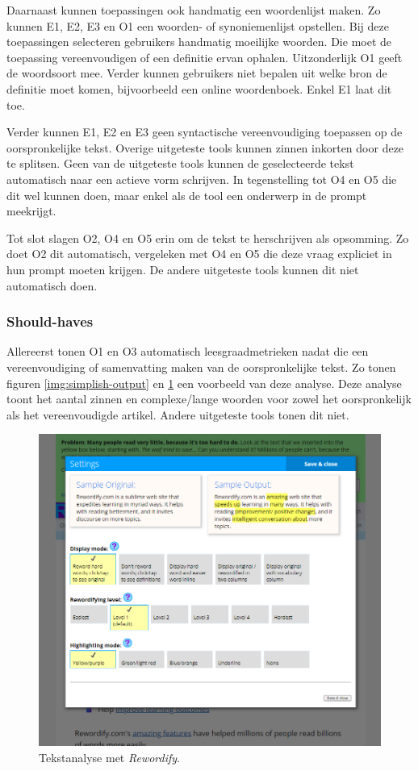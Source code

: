 Daarnaast kunnen toepassingen ook handmatig een woordenlijst maken. Zo kunnen E1, E2, E3 en O1 een woorden- of synoniemenlijst opstellen. Bij deze toepassingen selecteren gebruikers handmatig moeilijke woorden. Die moet de toepassing vereenvoudigen of een definitie ervan ophalen. Uitzonderlijk O1 geeft de woordsoort mee. Verder kunnen gebruikers niet bepalen uit welke bron de definitie moet komen, bijvoorbeeld een online woordenboek. Enkel E1 laat dit toe.

\medspace

Verder kunnen E1, E2 en E3 geen syntactische vereenvoudiging toepassen op de oorspronkelijke tekst. Overige uitgeteste tools kunnen zinnen inkorten door deze te splitsen. Geen van de uitgeteste tools kunnen de geselecteerde tekst automatisch naar een actieve vorm schrijven. In tegenstelling tot O4 en O5 die dit wel kunnen doen, maar enkel als de tool een onderwerp in de prompt meekrijgt. 

\medspace

Tot slot slagen O2, O4 en O5 erin om de tekst te herschrijven als opsomming. Zo doet O2 dit automatisch, vergeleken met O4 en O5 die deze vraag expliciet in hun prompt moeten krijgen. De andere uitgeteste tools kunnen dit niet automatisch doen. 

\subsubsection{Should-haves}

Allereerst tonen O1 en O3 automatisch leesgraadmetrieken nadat die een vereenvoudiging of samenvatting maken van de oorspronkelijke tekst. Zo tonen figuren \ref{img:simplish-output} en \ref{img:scholarcy} een voorbeeld van deze analyse. Deze analyse toont het aantal zinnen en complexe/lange woorden voor zowel het oorspronkelijk als het vereenvoudigde artikel. Andere uitgeteste tools tonen dit niet.

\begin{figure}[H]
	\includegraphics[width=\linewidth]{img/scholarcy-attempt.png}
	\caption{Tekstanalyse met \textit{Rewordify}.}
	\label{img:scholarcy}
\end{figure}

